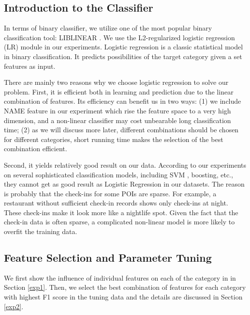 \subsection{Introduction to the Classifier}
\label{sec2}
In terms of binary classifier, we utilize one of the most
popular binary classification tool: LIBLINEAR \cite{liblinear}.
We use the L2-regularized logistic regression (LR) module in our experiments.
Logistic regression is a classic statistical model in binary classification.
It predicts possibilities of the target category given a set features as input.

There are mainly two reasons why we choose logistic regression to solve our problem.
First, it is efficient both in learning and prediction due to the linear combination of features.
Its efficiency can benefit us in two ways: (1) we include NAME feature in our experiment
which rise the feature space to a very high dimension, and a non-linear classifier
may cost unbearable long classification time; (2) as we will discuss more later,
different combinations should be chosen for different categories,
short running time makes the selection of the best combination efficient.

Second, it yields relatively good result on our data. According to our experiments on
several sophisticated classification models, including SVM \cite{Cortes:1995:SN:218919.218929},
boosting, etc., they cannot get as good result as Logistic Regression in our datasets.
The reason is probably that the check-ins for some POIs are sparse.
For example, a restaurant without sufficient
check-in records shows only check-ins at night. These check-ins make it look more like a
nightlife spot. Given the fact that the check-in data is often sparse,
a complicated non-linear model is more likely to overfit the training data.

\subsection{Feature Selection and Parameter Tuning}
We first show the influence of individual features on each of the category in 
in Section \ref{exp1}. Then, we select the best combination of features for each category 
with highest F1 score in the tuning data and the details are discussed in Section \ref{exp2}.

